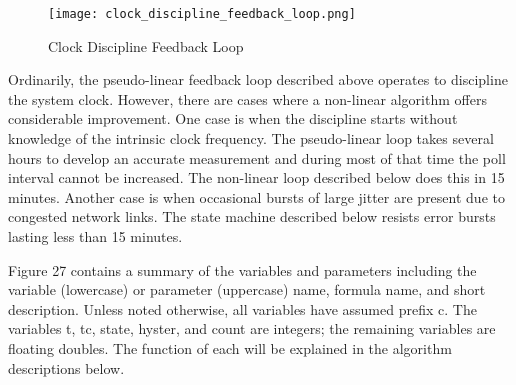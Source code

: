 \begin{figure}
\centering
\texttt{[image: clock\_discipline\_feedback\_loop.png]}
\caption{Clock Discipline Feedback Loop}
\label{clock_discipline_feedback_loop}
\end{figure}

Ordinarily, the pseudo-linear feedback loop described above operates
to discipline the system clock.  However, there are cases where a
non-linear algorithm offers considerable improvement.  One case is
when the discipline starts without knowledge of the intrinsic clock
frequency.  The pseudo-linear loop takes several hours to develop an
accurate measurement and during most of that time the poll interval
cannot be increased.  The non-linear loop described below does this
in 15 minutes.  Another case is when occasional bursts of large
jitter are present due to congested network links.  The state machine
described below resists error bursts lasting less than 15 minutes.

Figure 27 contains a summary of the variables and parameters
including the variable (lowercase) or parameter (uppercase) name,
formula name, and short description.  Unless noted otherwise, all
variables have assumed prefix c.  The variables t, tc, state, hyster,
and count are integers; the remaining variables are floating doubles.
The function of each will be explained in the algorithm descriptions
below.

